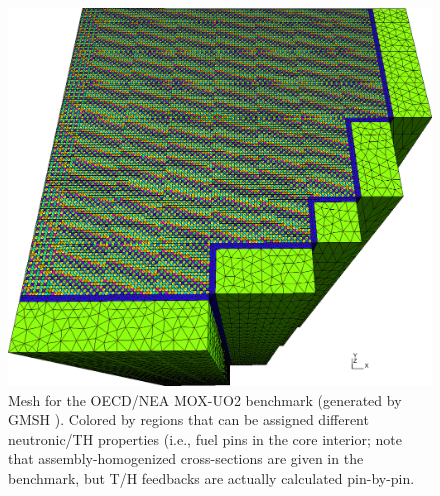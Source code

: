 \begin{figure}[!ht]
\centering
  \includegraphics[width=.7\textwidth]{mox/mesh}
  \caption[Mesh for the OECD/NEA MOX-UO2 benchmark]{Mesh for the OECD/NEA MOX-UO2 benchmark (generated by GMSH
  \cite{GMSH}).  Colored by regions that can be assigned different neutronic/TH properties (i.e., fuel pins in the
  core interior; note that assembly-homogenized cross-sections are given in the benchmark, but T/H feedbacks are
  actually calculated pin-by-pin.}
\end{figure}

